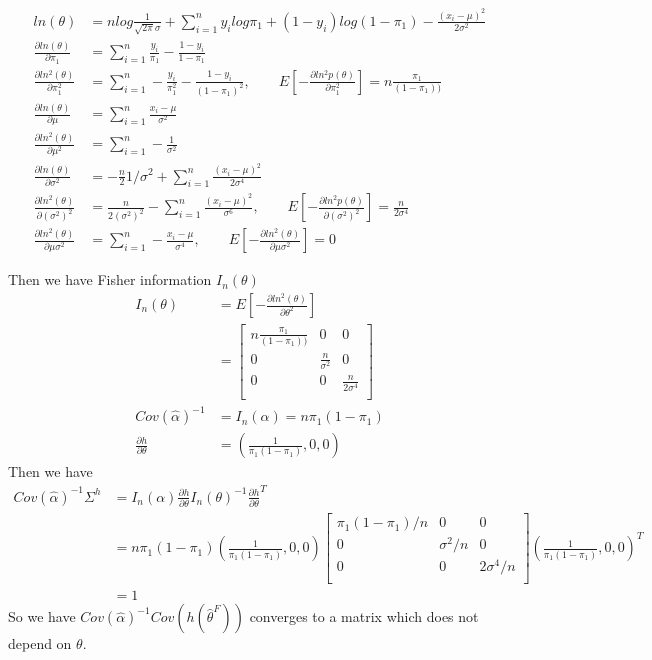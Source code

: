 \documentclass[11pt]{article} %
\begin{document}
\begin{align*}
	ln(\theta) &= nlog \frac{1}{\sqrt{2\pi}\sigma} + \sum_{i=1}^n y_i log\pi_1 + (1-y_i) log(1-\pi_1) - \frac{(x_i-\mu)^2}{2\sigma^2} \\
	\frac{\partial ln (\theta)}{\partial \pi_1}  &= \sum_{i=1}^n \frac{y_i}{\pi_1} - \frac{1-y_i}{1-\pi_1} \\
	\frac{\partial ln^2 (\theta)}{\partial \pi_1^2}  &= \sum_{i=1}^n -\frac{y_i}{\pi_1^2} - \frac{1-y_i}{(1-\pi_1)^2} , \qquad E[-\frac{\partial ln^2 p(\theta)}{\partial \pi_1^2}] = n\frac{\pi_1}{(1-\pi_1))}\\
	\frac{\partial ln (\theta)}{\partial \mu}  &= \sum_{i=1}^n \frac{x_i-\mu}{\sigma^2}  \\
	\frac{\partial ln^2 (\theta)}{\partial \mu^2}  &= \sum_{i=1}^n -\frac{1}{\sigma^2}  \\  
	\frac{\partial ln (\theta)}{\partial \sigma^2}  &=-\frac{n}{2}{1/\sigma^2} + \sum_{i=1}^n \frac{(x_i-\mu)^2}{2\sigma^4} \\
	\frac{\partial ln^2 (\theta)}{\partial (\sigma^2)^2}  &= \frac{n}{2(\sigma^2)^2} - \sum_{i=1}^n \frac{(x_i-\mu)^2}{\sigma^6}, \qquad E[-\frac{\partial ln^2 p(\theta)}{\partial (\sigma^2)^2}] = \frac{n}{2\sigma^4}  \\ 
	\frac{\partial ln^2 (\theta)}{\partial \mu\sigma^2}  &= \sum_{i=1}^n- \frac{x_i-\mu}{\sigma^4} , \qquad E[-\frac{\partial ln^2 (\theta)}{\partial \mu\sigma^2}] = 0
\end{align*}
	
	
	Then we have Fisher information $I_n(\theta) $
	\begin{align*}   
		I_n(\theta) &= E[-\frac{\partial ln^2 (\theta)}{\partial \theta^2}] \\
		&= \begin{bmatrix}
			n\frac{\pi_1}{(1-\pi_1))}  & 0 & 0 \\
			0 & \frac{n}{\sigma^2}   &  0 \\
			0 &  0 & \frac{n}{2\sigma^4} \\
		\end{bmatrix}\\
		Cov(\hat\alpha)^{-1} &= I_n(\alpha) = n\pi_1(1-\pi_1)\\
		\frac{\partial h}{\partial \theta} &= (\frac{1}{\pi_1(1-\pi_1)}, 0 , 0)
	\end{align*} 
	Then we have
	\begin{align*}   
		Cov(\hat\alpha)^{-1} \Sigma^{h} &= I_n(\alpha) \frac{\partial h}{\partial \theta} I_n(\theta)^{-1} \frac{\partial h}{\partial \theta}^T\\
		&=  n\pi_1(1-\pi_1)  (\frac{1}{\pi_1(1-\pi_1)}, 0 , 0) \begin{bmatrix}
			\pi_1(1-\pi_1)/n  & 0 & 0 \\
			0 & \sigma^2/n   &  0 \\
			0 &  0 & 2\sigma^4/n \\
		\end{bmatrix} (\frac{1}{\pi_1(1-\pi_1)}, 0 , 0)^T\\   
		&= 1
	\end{align*}     
	So we have $Cov(\hat\alpha)^{-1} Cov(h(\hat\theta^F))$ converges to a matrix which does not depend on $\theta$.
	
\end{document}
